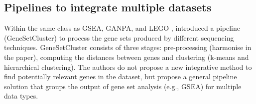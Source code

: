 



\subsection*{Pipelines to integrate multiple datasets} \label{s:pipelines}


Within the same class as GSEA, GANPA, and LEGO \citep{Fan2020-yb, Dong2016-zs}, \citet{Ewing2020-os} introduced a pipeline (GeneSetCluster) to process the gene sets produced by different sequencing techniques. GeneSetCluster consists of three stages: pre-processing (harmonise in the paper), computing the distances between genes and clustering (k-means and hierarchical clustering). The authors do not propose a new integrative method to find potentially relevant genes in the dataset, but propose a general pipeline solution that groups the output of gene set analysis (e.g., GSEA) for multiple data types.

